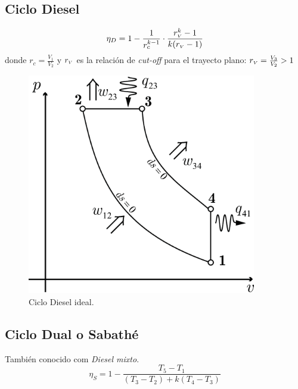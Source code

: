 \documentclass{article}
\newcommand{\ctegas}{k}
\newcommand{\rc}{r_c}
\newcommand{\rv}{r_{\mbox{\tiny$V$}}}
\begin{document}
\subsection{Ciclo Diesel}

\begin{equation}
\eta_D=1-\frac{1}{\rc^{\ctegas-1}}\cdot\frac{\rv^k -1}{\ctegas(\rv-1)}
\end{equation}
donde $\rc=\frac{V_1}{V_2}$ y $\rv$ es la relación de \textit{cut-off} para el trayecto plano: $\rv=\frac{V_3}{V_2}>1$
\begin{figure}[htb!]
    \centering
    \includegraphics[width=10cm]{fig/ciclodiesel.eps}
    \caption{Ciclo Diesel ideal.}
    \label{fig:dieselideal}
\end{figure}

\subsection{Ciclo Dual o Sabathé}
También conocido com \textit{Diesel mixto}. 
\begin{equation}
\eta_S=1- \frac{T_5-T_1}{(T_3-T_2)+\ctegas(T_4-T_3)}
\end{equation}
\end{document}
